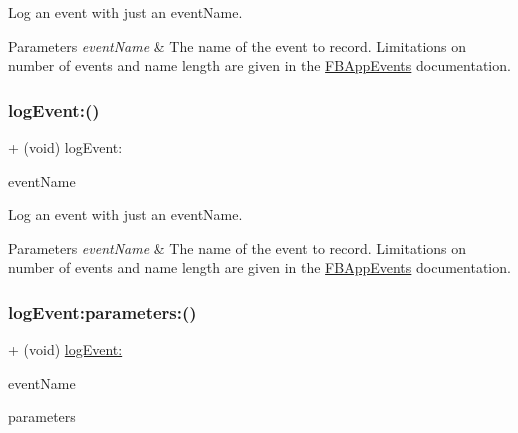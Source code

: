 Log an event with just an event\+Name.


\begin{DoxyParams}{Parameters}
{\em event\+Name} & The name of the event to record. Limitations on number of events and name length are given in the {\ttfamily \hyperlink{interfaceFBAppEvents}{F\+B\+App\+Events}} documentation. \\
\hline
\end{DoxyParams}
\mbox{\label{interfaceFBAppEvents_a816373dd50bcf7381bf8194758ef8441}} 
\subsubsection{\texorpdfstring{log\+Event\+:()}{logEvent:()}\hspace{0.1cm}{\footnotesize\ttfamily [5/5]}}
{\footnotesize\ttfamily + (void) log\+Event\+: \begin{DoxyParamCaption}\item[{(N\+S\+String $\ast$)}]{event\+Name }\end{DoxyParamCaption}}

Log an event with just an event\+Name.


\begin{DoxyParams}{Parameters}
{\em event\+Name} & The name of the event to record. Limitations on number of events and name length are given in the {\ttfamily \hyperlink{interfaceFBAppEvents}{F\+B\+App\+Events}} documentation. \\
\hline
\end{DoxyParams}
\mbox{\label{interfaceFBAppEvents_a68b55bf0f5695fdf0089326473fcf4ea}} 
\subsubsection{\texorpdfstring{log\+Event\+:parameters\+:()}{logEvent:parameters:()}\hspace{0.1cm}{\footnotesize\ttfamily [1/5]}}
{\footnotesize\ttfamily + (void) \hyperlink{interfaceFBAppEvents_a816373dd50bcf7381bf8194758ef8441}{log\+Event\+:} \begin{DoxyParamCaption}\item[{(N\+S\+String $\ast$)}]{event\+Name }\item[{parameters:(N\+S\+Dictionary $\ast$)}]{parameters }\end{DoxyParamCaption}}

